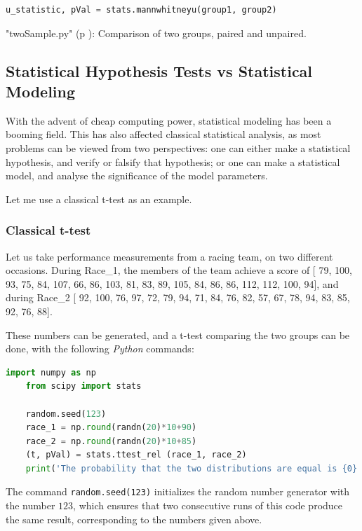 \begin{lstlisting}[language=Python]
    u_statistic, pVal = stats.mannwhitneyu(group1, group2)
\end{lstlisting}


\PyImg "twoSample.py" (p \pageref{py:twoSample}): Comparison of two groups, paired and unpaired.

\subsection{Statistical Hypothesis Tests vs Statistical Modeling}

With the advent of cheap computing power, statistical modeling has been a booming field. This has also affected classical statistical analysis, as most problems can be viewed from two perspectives: one can either make a statistical hypothesis, and verify or falsify that hypothesis; or one can make a statistical model, and analyse the significance of the model parameters.

Let me use a classical t-test as an example.

\subsubsection{Classical t-test}

Let us take performance measurements from a racing team, on two different occasions. During Race\_1, the members of the team achieve a score of [ 79, 100, 93, 75, 84, 107, 66, 86, 103, 81, 83, 89, 105, 84, 86, 86, 112, 112, 100, 94], and during Race\_2 [ 92, 100, 76, 97, 72, 79, 94, 71, 84, 76, 82, 57, 67, 78, 94, 83, 85, 92, 76, 88].

These numbers can be generated, and a t-test comparing the two groups can be done, with the following \emph{Python} commands:

\begin{lstlisting}[language=Python]
    import numpy as np
    from scipy import stats

    random.seed(123)
    race_1 = np.round(randn(20)*10+90)
    race_2 = np.round(randn(20)*10+85)
    (t, pVal) = stats.ttest_rel (race_1, race_2)
    print('The probability that the two distributions are equal is {0}'.format(pVal))
\end{lstlisting}

The command \lstinline{random.seed(123)} initializes the random number generator with the number $123$, which ensures that two consecutive runs of this code produce the same result, corresponding to the numbers given above.

